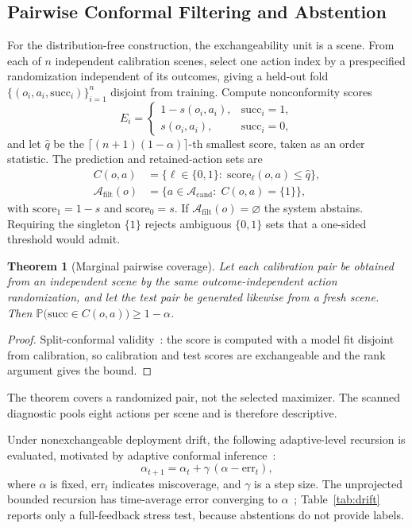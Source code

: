 \documentclass[letterpaper, 10pt, conference]{ieeeconf}
\newtheorem{theorem}{Theorem}
\newcommand{\Prob}{\mathbb{P}}
\newcommand{\suff}{\mathrm{succ}}
\newcommand{\Afilt}{\mathcal{A}_{\mathrm{filt}}}
\begin{document}
\subsection{Pairwise Conformal Filtering and Abstention}
\label{sec:conformal}
For the distribution-free construction, the exchangeability unit is a scene.
From each of $n$ independent calibration scenes, select one action index by a
prespecified randomization independent of its outcomes, giving a held-out fold
${\bigl\{(o_i,a_i,\suff_i)\bigr\}}_{i=1}^{n}$ disjoint from training. Compute
nonconformity scores
\begin{equation}
E_i=\begin{cases}1-s(o_i,a_i), & \suff_i=1,\\[2pt]
s(o_i,a_i), & \suff_i=0,\end{cases}
\label{eq:scores}
\end{equation}
and let $\hat q$ be the $\lceil(n{+}1)(1{-}\alpha)\rceil$-th smallest score,
taken as an order statistic. The prediction and retained-action sets are
\begin{align}
C(o,a)&=\bigl\{\ell\in\{0,1\}:\;\mathrm{score}_\ell(o,a)\le\hat q\bigr\},
\label{eq:predset}\\
\Afilt(o)&=\bigl\{a\in\mathcal{A}_{\mathrm{cand}}:\;C(o,a)=\{1\}\bigr\},
\label{eq:certset}
\end{align}
with $\mathrm{score}_1=1-s$ and $\mathrm{score}_0=s$. If
$\Afilt(o)=\varnothing$ the system abstains. Requiring the singleton $\{1\}$
rejects ambiguous $\{0,1\}$ sets that a one-sided threshold would admit.

\begin{theorem}[Marginal pairwise coverage]
\label{thm:coverage}
Let each calibration pair be obtained from an independent scene by the same
outcome-independent action randomization, and let the test pair be generated
likewise from a fresh scene. Then
$\Prob\bigl(\suff\in C(o,a)\bigr)\ge1-\alpha$.
\end{theorem}
\begin{proof}
Split-conformal validity~\cite{vovk2005}: the score is computed with a model
fit disjoint from calibration, so calibration and test scores are exchangeable
and the rank argument gives the bound.
\end{proof}

The theorem covers a randomized pair, not the selected maximizer. The scanned
diagnostic pools eight actions per scene and is therefore descriptive.

Under nonexchangeable deployment drift, the following adaptive-level
recursion is evaluated, motivated by adaptive conformal
inference~\cite{gibbs2021adaptive}:
\begin{equation}
\alpha_{t+1}=\alpha_t+\gamma\,(\alpha-\mathrm{err}_t),
\label{eq:aci}
\end{equation}
where $\alpha$ is fixed, $\mathrm{err}_t$ indicates miscoverage, and $\gamma$
is a step size. The unprojected bounded recursion has time-average error
converging to $\alpha$~\cite{gibbs2021adaptive}; Table~\ref{tab:drift} reports
only a full-feedback stress test, because abstentions do not provide labels.
\end{document}
